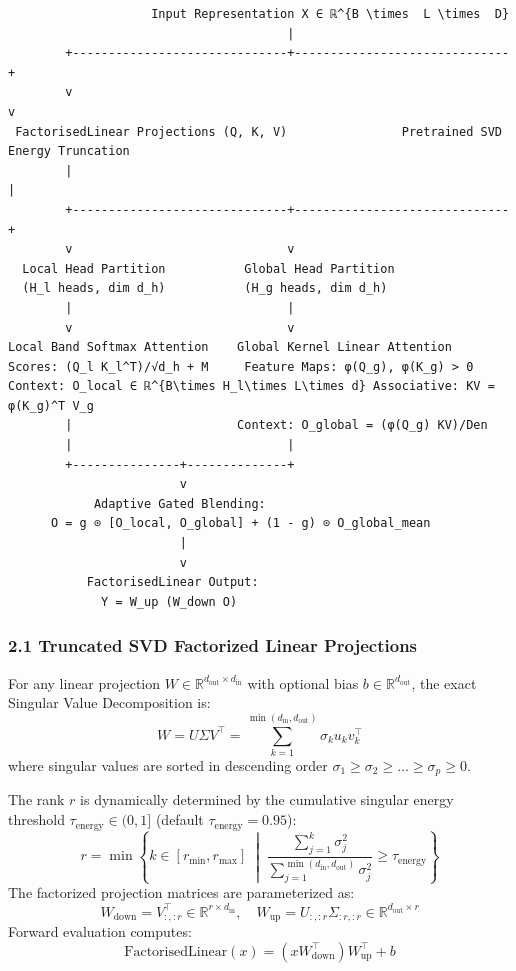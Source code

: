 \begin{lstlisting}
                    Input Representation X ∈ ℝ^{B \times  L \times  D}
                                       |
        +------------------------------+------------------------------+
        v                                                             v
 FactorisedLinear Projections (Q, K, V)                Pretrained SVD Energy Truncation
        |                                                             |
        +------------------------------+------------------------------+
        v                              v
  Local Head Partition           Global Head Partition
  (H_l heads, dim d_h)           (H_g heads, dim d_h)
        |                              |
        v                              v
Local Band Softmax Attention    Global Kernel Linear Attention
Scores: (Q_l K_l^T)/√d_h + M     Feature Maps: φ(Q_g), φ(K_g) > 0
Context: O_local ∈ ℝ^{B\times H_l\times L\times d} Associative: KV = φ(K_g)^T V_g
        |                       Context: O_global = (φ(Q_g) KV)/Den
        |                              |
        +---------------+--------------+
                        v
            Adaptive Gated Blending:
      O = g ⊙ [O_local, O_global] + (1 - g) ⊙ O_global_mean
                        |
                        v
           FactorisedLinear Output:
             Y = W_up (W_down O)
\end{lstlisting}


\subsubsection{2.1 Truncated SVD Factorized Linear Projections}

For any linear projection $W \in \mathbb{R}^{d_{\text{out}} \times d_{\text{in}}}$ with optional bias $b \in \mathbb{R}^{d_{\text{out}}}$, the exact Singular Value Decomposition is:$$W = U \Sigma V^\top = \sum_{k=1}^{\min(d_{\text{in}}, d_{\text{out}})} \sigma_k u_k v_k^\top$$
where singular values are sorted in descending order $\sigma_1 \ge \sigma_2 \ge \dots \ge \sigma_p \ge 0$.

The rank $r$ is dynamically determined by the cumulative singular energy threshold $\tau_{\text{energy}} \in (0, 1]$ (default $\tau_{\text{energy}} = 0.95$):$$r = \min \left\{ k \in [r_{\min}, r_{\max}] \;\middle|\; \frac{\sum_{j=1}^k \sigma_j^2}{\sum_{j=1}^{\min(d_{\text{in}}, d_{\text{out}})} \sigma_j^2} \ge \tau_{\text{energy}} \right\}$$
The factorized projection matrices are parameterized as:$$W_{\text{down}} = V_{:, :r}^\top \in \mathbb{R}^{r \times d_{\text{in}}}, \quad W_{\text{up}} = U_{:, :r} \Sigma_{:r, :r} \in \mathbb{R}^{d_{\text{out}} \times r}$$
Forward evaluation computes:$$\text{FactorisedLinear}(x) = (x W_{\text{down}}^\top) W_{\text{up}}^\top + b$$

